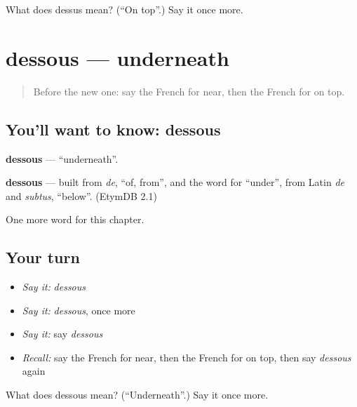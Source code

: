 \begin{tcolorbox}[breakable,colback=teal!4,colframe=teal!35!black,title={Before you move on}]
What does dessus mean? (\textquotedblleft{}On top\textquotedblright{}.) Say it once more.
\end{tcolorbox}
\section[dessous]{dessous — underneath}

\label{lesson:FR-C97-dessous}



\begin{quote}
Before the new one: say the French for near, then the French for on top.
\end{quote}

\subsection*{You'll want to know: dessous}
\textbf{dessous} — \textquotedblleft{}underneath\textquotedblright{}.

\begin{cousinweb}
\textbf{dessous} — built from \emph{de}, \textquotedblleft{}of, from\textquotedblright{}, and the word for \textquotedblleft{}under\textquotedblright{}, from Latin \emph{de} and \emph{subtus}, \textquotedblleft{}below\textquotedblright{}. (EtymDB 2.1)
\end{cousinweb}

\begin{grammarlens}[title={What you've built}]
One more word for this chapter.
\end{grammarlens}

\subsection*{Your turn}
\begin{itemize}
\raggedright
  \item \emph{Say it:} \emph{dessous}
  \item \emph{Say it:} \emph{dessous}, once more
  \item \emph{Say it:} say \emph{dessous}
  \item \emph{Recall:} say the French for near, then the French for on top, then say \emph{dessous} again
\end{itemize}

\begin{tcolorbox}[breakable,colback=teal!4,colframe=teal!35!black,title={Before you move on}]
What does dessous mean? (\textquotedblleft{}Underneath\textquotedblright{}.) Say it once more.
\end{tcolorbox}
